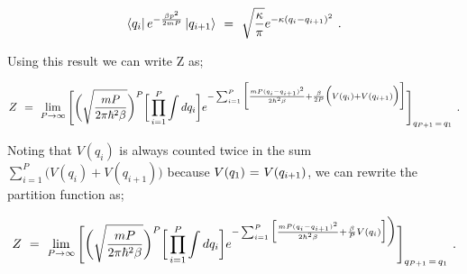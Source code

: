 \documentclass{ece}
\begin{document}
\begin{equation} \label{eq:27}
\bra{q_i} e^{ - \frac{ \beta p^2}{2 m P}} \ket{q_{i+1}} \hspace{0.125cm} = \hspace{0.125cm} \sqrt{\frac{\kappa}{\pi}} e^{- \kappa (q_i - q_{i+1})^2} \hspace{0.125cm} .
\end{equation}

Using this result we can write Z as;

\begin{equation} \label{eq:28}
Z \hspace{0.125cm} = \hspace{0.125cm} \lim_{P \rightarrow \infty} \Bigg[ \bigg(\sqrt{\frac{m P}{2 \pi \hbar^2 \beta}}\bigg)^{P} \bigg[ \prod_{i=1}^{P} \int d q_i \bigg] e^{- \sum_{i = 1}^{P} \bigg[ \frac{ m P (q_i - q_{i+1})^2}{2 \hbar^2 \beta} + \frac{\beta}{2P} \Big( V(q_i) + V(q_{i + 1}) \Big) \bigg]} \Bigg]_{q_{P + 1} \hspace{0.05cm} = \hspace{0.05cm} q_1} \hspace{0.125cm} .
\end{equation}

Noting that \begin{math} V(q_i) \end{math} is always counted twice in the sum \begin{math} \sum_{i = 1}^{P} \Big( V(q_i) + V(q_{i + 1}) \Big) \end{math} because \begin{math} V(q_1) \hspace{0.025cm} = \hspace{0.025cm} V(q_{i + 1}) \end{math}, we can rewrite the partition function as; 

\begin{equation} \label{eq:29}
Z \hspace{0.125cm} = \hspace{0.125cm} \lim_{P \rightarrow \infty} \Bigg[ \bigg(\sqrt{\frac{m P}{2 \pi \hbar^2 \beta}}\bigg)^{P} \bigg[ \prod_{i=1}^{P} \int d q_i \bigg] e^{- \sum_{i = 1}^{P} \Big[ \frac{ m P (q_i - q_{i+1})^2}{2 \hbar^2 \beta} + \frac{\beta}{P} V(q_i) \Big] \bigg)} \Bigg]_{q_{P + 1} \hspace{0.05cm} = \hspace{0.05cm} q_1} \hspace{0.125cm} .
\end{equation}
\end{document}
